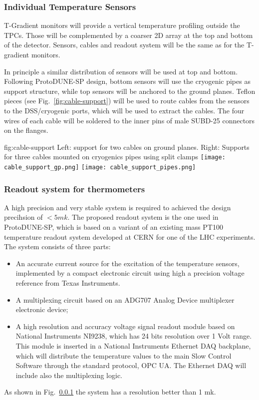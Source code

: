 \subsubsection{Individual Temperature Sensors}

T-Gradient monitors will provide a vertical temperature profiling outside the TPCs. Those will be complemented by a coarser 2D array at the top and bottom of the
detector. Sensors, cables and readout system will be the same as for the T-gradient monitors. 

In principle a similar distribution of sensors will be used at top and bottom.
Following ProtoDUNE-SP design, bottom sensors will use the cryogenic pipes as support structure, while top sensors will be anchored to the ground planes.
Teflon pieces (see Fig.~\ref{fig:cable-support}) will be used to route cables from the sensors to the DSS/cryogenic ports, which will be used to extract the cables.
The four wires of each cable will be soldered to the inner pins of male SUBD-25 connectors on the flanges. 

\begin{dunefigure}{fig:cable-support}
  {Left: support for two cables on ground planes. Right: Supports for three cables  mounted on cryogenics pipes using split clamps}
  \texttt{[image: cable\_support\_gp.png]}
  \texttt{[image: cable\_support\_pipes.png]}
\end{dunefigure}


\subsubsection{Readout system for thermometers}
\label{sec:fdsp-slow-cryo-therm-readout}

A high precision and very stable system is required to achieved the design precihsion of $< 5 mk$.
The proposed readout system is the one used in ProtoDUNE-SP, which is based on a variant of an existing mass PT100 temperature readout system developed at
CERN for one of the LHC experiments. The system consists of three parts:
\begin{itemize}
\item An accurate current source for the excitation of the temperature sensors, implemented by a compact electronic circuit using high a precision voltage reference from Texas Instruments. 
\item A multiplexing circuit based on an ADG707 Analog Device multiplexer electronic device;
\item A high resolution and accuracy voltage signal readout module based on National Instruments NI9238, which has 24 bits resolution over 1 Volt range.
  This module is inserted in a National Instruments Ethernet DAQ backplane, which will distribute the temperature values to the main Slow Control Software
  through the standard protocol, OPC UA. The Ethernet DAQ will include also the multiplexing logic.
\end{itemize}

As shown in Fig.~\ref{} the system has a resolution better than 1 mk.  
